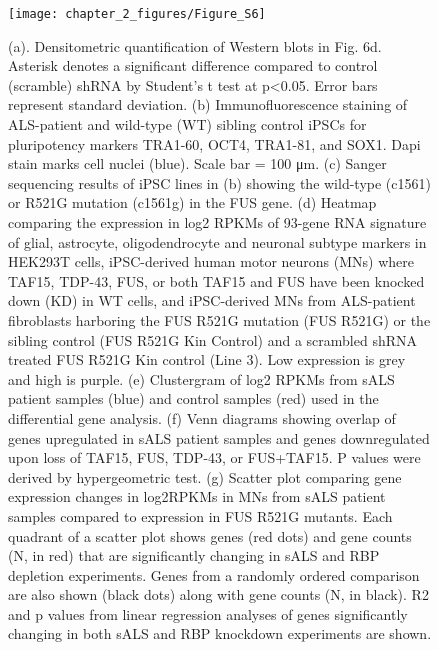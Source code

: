 \begin{figure}[ht]
  \centering
  \texttt{[image: chapter\_2\_figures/Figure\_S6]}
  \caption[Supplementary Figure 6. Characterization of motor neuron model systems of sALS]{(a). Densitometric quantification of Western blots in Fig. 6d. Asterisk denotes a significant difference compared to control (scramble) shRNA by Student’s t test at p<0.05. Error bars represent standard deviation. (b) Immunofluorescence staining of ALS-patient and wild-type (WT) sibling control iPSCs for pluripotency markers TRA1-60, OCT4, TRA1-81, and SOX1. Dapi stain marks cell nuclei (blue). Scale bar = 100 μm.  (c) Sanger sequencing results of iPSC lines in (b) showing the wild-type (c1561) or R521G mutation (c1561g) in the FUS gene. (d) Heatmap comparing the expression in log2 RPKMs of 93-gene RNA signature of glial, astrocyte, oligodendrocyte and neuronal subtype markers in HEK293T cells, iPSC-derived human motor neurons (MNs) where TAF15, TDP-43, FUS, or both TAF15 and FUS have been knocked down (KD) in WT cells, and iPSC-derived MNs from ALS-patient fibroblasts harboring the FUS R521G mutation (FUS R521G) or the sibling control (FUS R521G Kin Control) and a scrambled shRNA treated FUS R521G Kin control (Line 3). Low expression is grey and high is purple. (e) Clustergram of log2 RPKMs from sALS patient samples (blue) and control samples (red) used in the differential gene analysis. (f) Venn diagrams showing overlap of genes upregulated in sALS patient samples and genes downregulated upon loss of TAF15, FUS, TDP-43, or FUS+TAF15. P values were derived by hypergeometric test. (g) Scatter plot comparing gene expression changes in log2RPKMs in MNs from sALS patient samples compared to expression in FUS R521G mutants. Each quadrant of a scatter plot shows genes (red dots) and gene counts (N, in red) that are significantly changing in sALS and RBP depletion experiments. Genes from a randomly ordered comparison are also shown (black dots) along with gene counts (N, in black). R2 and p values from linear regression analyses of genes significantly changing in both sALS and RBP knockdown experiments are shown.}
  \label{fig:Figure_S6}
\end{figure}

